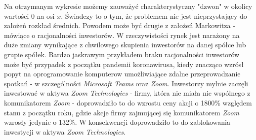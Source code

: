 \documentclass[magister]{dyplom}
\begin{document}
Na otrzymanym wykresie możemy zauważyć charakterystyczny "dzwon" w okolicy wartości $0$ na osi $x$. Świadczy to o tym, że problemem nie jest nieprzystający do założeń rozkład średnich. Powodem może być drugie z założeń Markowitza - mówiące o racjonalności inwestorów. W rzeczywistości rynek jest narażony na duże zmiany wynikające z chwilowego skupienia inwestorów na danej spółce lub grupie spółek\cite{simplifiedmarkowitz}. Bardzo jaskrawym przykładem braku racjonalności inwestorów może być przypadek z początku pandemii koronawirusa, kiedy znacząco wzrósł popyt na oprogramowanie komputerow umożliwiające zdalne przeprowadzanie spotkań - w szczególności \textit{Microsoft Teams} oraz \textit{Zoom}. Inwestorzy mylnie zaczęli inwestować w aktywa \textit{Zoom Technologies} - firmy, która nie miała nic wspólnego z komunikatorem \textit{Zoom} - doprowadziło to do wzrostu ceny akcji o 1800\% względem stanu z początku roku, gdzie akcje firmy zajmującej się komunikatorem \textit{Zoom} wzrosły jedynie o 132\%. W konsekwencji doprowadziło to do zablokowania inwestycji w aktywa \textit{Zoom Technologies}.\cite{zoominvest}
\end{document}
